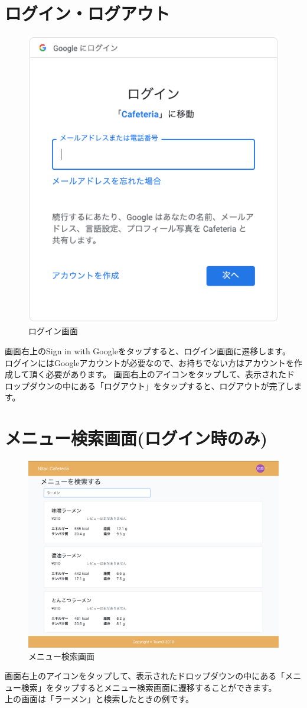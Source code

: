 \documentclass[a4paper]{jsarticle}
\begin{document}
\section{ログイン・ログアウト}
	\begin{figure}[htbp]
	\centering
	\includegraphics[scale = 0.35]{image/login.png}
	\caption{ログイン画面}
	\end{figure}
	画面右上のSign in with Googleをタップすると、ログイン画面に遷移します。\\
	ログインにはGoogleアカウントが必要なので、お持ちでない方はアカウントを作成して頂く必要があります。
	画面右上のアイコンをタップして、表示されたドロップダウンの中にある「ログアウト」をタップすると、ログアウトが完了します。
	\newpage
	\section{メニュー検索画面(ログイン時のみ)}
	\begin{figure}[htbp]
		\centering
		\includegraphics[scale = 0.225]{image/menu_search_ramen.png}
		\caption{メニュー検索画面}
		\end{figure}
		画面右上のアイコンをタップして、表示されたドロップダウンの中にある「メニュー検索」をタップするとメニュー検索画面に遷移することができます。\\
		上の画面は「ラーメン」と検索したときの例です。		
\end{document}
